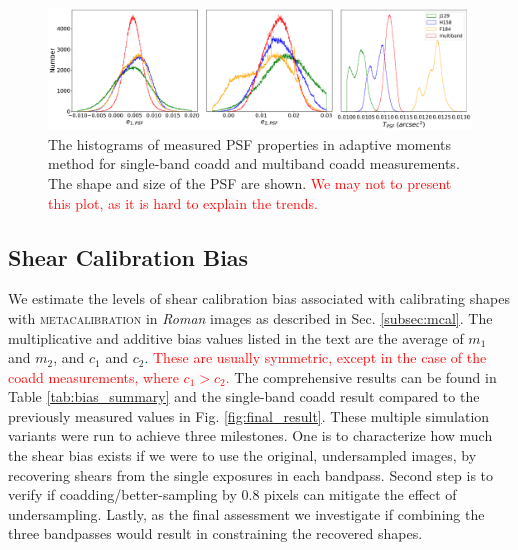 \documentclass[fleqn,usenatbib]{mnras}
\begin{document}
\begin{figure}
    \centering
	\includegraphics[width=\textwidth]{hsm_PSF_properties.pdf}
    \caption{The histograms of measured PSF properties in adaptive moments method for single-band coadd and multiband coadd measurements. The shape and size of the PSF are shown. \textcolor{red}{We may not to present this plot, as it is hard to explain the trends.}}
    \label{fig:hsm_measured_properties}
\end{figure}


\subsection{Shear Calibration Bias}
\label{subsec:shapes}
We estimate the levels of shear calibration bias associated with calibrating shapes with \textsc{metacalibration} in \emph{Roman} images as described in Sec. \ref{subsec:mcal}. The multiplicative and additive bias values listed in the text are the average of $m_{1}$ and $m_{2}$, and $c_{1}$ and $c_{2}$. \textcolor{red}{These are usually symmetric, except in the case of the coadd measurements, where $c_1>c_2$.} The comprehensive results can be found in Table \ref{tab:bias_summary} and the single-band coadd result compared to the previously measured values in Fig. \ref{fig:final_result}. These multiple simulation variants were run to achieve three milestones. One is to characterize how much the shear bias exists if we were to use the original, undersampled images, by recovering shears from the single exposures in each bandpass. Second step is to verify if coadding/better-sampling by 0.8 pixels can mitigate the effect of undersampling. Lastly, as the final assessment we investigate if combining the three bandpasses would result in constraining the recovered shapes.
\end{document}
